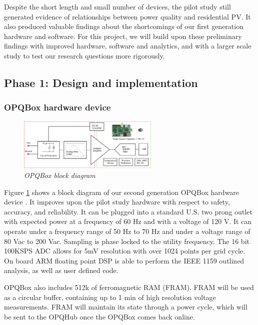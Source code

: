 Despite the short length and small number of devices, the pilot study still generated evidence of relationships between power quality and residential PV. It also produced valuable findings about the shortcomings of our first generation hardware and software.  For this project, we will build upon these preliminary findings with improved hardware, software and analytics, and with a larger scale study to test our research questions more rigorously.

\subsection{Phase 1: Design and implementation}

\subsubsection{OPQBox hardware device}

\begin{figure}
  \includegraphics[width=0.6\textwidth]{figures/opq2.eps}
  \caption{\em \small OPQBox block diagram}
  \label{fig:hardware-block-diagram}
\end{figure} 

Figure \ref{fig:hardware-block-diagram} shows a block diagram of our second generation OPQBox hardware device \cite{opqbox2}. It improves upon the pilot study hardware with respect to safety, accuracy, and reliability. It can be plugged into a standard U.S. two prong outlet with expected power at a frequency of 60 Hz and with a voltage of 120 V. It can operate under a frequency range of 50 Hz to 70 Hz and under a voltage range of 80 Vac to 200 Vac. Sampling is phase locked to the utility frequency. The 16 bit 100KSPS ADC allows for 5mV resolution with over 1024 points per grid cycle. On board ARM floating point DSP is able to perform the IEEE 1159 outlined analysis, as well as user defined code. 

OPQBox also includes 512k of ferromagnetic RAM (FRAM). FRAM will be used as a circular buffer, containing up to 1 min of high resolution voltage measurements. FRAM will maintain its state through a power cycle, which will be sent to the OPQHub once the OPQBox comes back online.

